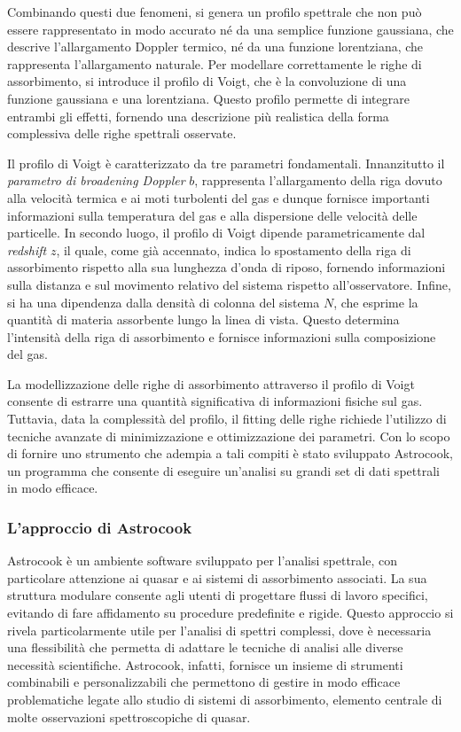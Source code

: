\documentclass[a4paper,12pt]{article}
\begin{document}
Combinando questi due fenomeni, si genera un profilo spettrale che non può essere rappresentato in modo accurato né da una semplice funzione gaussiana, che descrive l'allargamento Doppler termico, né da una funzione lorentziana, che rappresenta l'allargamento naturale. Per modellare correttamente le righe di assorbimento, si introduce il profilo di Voigt, che è la convoluzione di una funzione gaussiana e una lorentziana. Questo profilo permette di integrare entrambi gli effetti, fornendo una descrizione più realistica della forma complessiva delle righe spettrali osservate.

Il profilo di Voigt è caratterizzato da tre parametri fondamentali. Innanzitutto il \textit{parametro di broadening Doppler} $b$, rappresenta l'allargamento della riga dovuto alla velocità termica e ai moti turbolenti del gas e dunque fornisce importanti informazioni sulla temperatura del gas e alla dispersione delle velocità delle particelle. In secondo luogo, il profilo di Voigt dipende parametricamente dal \textit{redshift} $z$, il quale, come già accennato, indica lo spostamento della riga di assorbimento rispetto alla sua lunghezza d'onda di riposo, fornendo informazioni sulla distanza e sul movimento relativo del sistema rispetto all'osservatore. Infine, si ha una dipendenza dalla densità di colonna del sistema $N$, che esprime la quantità di materia assorbente lungo la linea di vista. Questo determina l'intensità della riga di assorbimento e fornisce informazioni sulla composizione del gas.

La modellizzazione delle righe di assorbimento attraverso il profilo di Voigt consente di estrarre una quantità significativa di informazioni fisiche sul gas. Tuttavia, data la complessità del profilo, il fitting delle righe richiede l’utilizzo di tecniche avanzate di minimizzazione e ottimizzazione dei parametri. Con lo scopo di fornire uno strumento che adempia a tali compiti è stato sviluppato Astrocook, un programma che consente di eseguire un'analisi su grandi set di dati spettrali in modo efficace.


\subsubsection{L'approccio di Astrocook}
Astrocook è un ambiente software sviluppato per l'analisi spettrale, con particolare attenzione ai quasar e ai sistemi di assorbimento associati. La sua struttura modulare consente agli utenti di progettare flussi di lavoro specifici, evitando di fare affidamento su procedure predefinite e rigide. Questo approccio si rivela particolarmente utile per l’analisi di spettri complessi, dove è necessaria una flessibilità che permetta di adattare le tecniche di analisi alle diverse necessità scientifiche. Astrocook, infatti, fornisce un insieme di strumenti combinabili e personalizzabili che permettono di gestire in modo efficace problematiche legate allo studio di sistemi di assorbimento, elemento centrale di molte osservazioni spettroscopiche di quasar.
\end{document}
